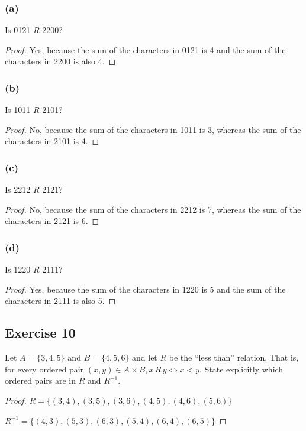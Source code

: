\documentclass[14pt]{extarticle}
\begin{document}
\subsubsection{(a)}
Is 0121 $R$ 2200?

\begin{proof}
        Yes, because the sum of the characters in 0121 is 4 and the sum of the characters in 2200 is also 4.
\end{proof}

\subsubsection{(b)}
Is 1011 $R$ 2101?

\begin{proof}
        No, because the sum of the characters in 1011 is 3, whereas the sum of the characters in 2101 is 4.
\end{proof}

\subsubsection{(c)}
Is 2212 $R$ 2121?

\begin{proof}
        No, because the sum of the characters in 2212 is 7, whereas the sum of the characters in 2121 is 6.
\end{proof}

\subsubsection{(d)}
Is 1220 $R$ 2111?

\begin{proof}
        Yes, because the sum of the characters in 1220 is 5 and the sum of the characters in 2111 is also 5.
\end{proof}

\subsection{Exercise 10}
Let \(A = \{3, 4, 5\}\) and \(B = \{4, 5, 6\}\) and let $R$ be the “less than” relation. That is, for every ordered
pair \((x, y) \in A \times B, x \, R \, y \iff x < y\). State explicitly which ordered pairs are in $R$ and $R^{-1}$.

\begin{proof}
        \(R = \{(3, 4), (3, 5), (3, 6), (4, 5), (4, 6), (5, 6)\}\)

        \(R^{-1} = \{(4, 3), (5, 3), (6, 3), (5, 4), (6, 4), (6, 5)\}\)
\end{proof}
\end{document}
